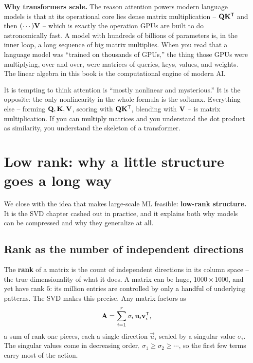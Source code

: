 \begin{applicationbox}
\textbf{Why transformers scale.} The reason attention powers modern language models is
that at its operational core lies dense matrix multiplication -- $\mathbf{Q}\mathbf{K}^{\mathsf{T}}$ and then
$(\cdots)\mathbf{V}$ -- which is exactly the operation GPUs are built to do astronomically
fast. A model with hundreds of billions of parameters is, in the inner loop, a long
sequence of big matrix multiplies. When you read that a language model was ``trained on
thousands of GPUs,'' the thing those GPUs were multiplying, over and over, were matrices
of queries, keys, values, and weights. The linear algebra in this book is the
computational engine of modern AI.
\end{applicationbox}

\begin{trapbox}
It is tempting to think attention is ``mostly nonlinear and mysterious.'' It is the
opposite: the only nonlinearity in the whole formula is the softmax. Everything else --
forming $\mathbf{Q},\mathbf{K},\mathbf{V}$, scoring with $\mathbf{Q}\mathbf{K}^{\mathsf{T}}$, blending with
$\mathbf{V}$ -- is matrix multiplication. If you can multiply matrices and you understand the
dot product as similarity, you understand the skeleton of a transformer.
\end{trapbox}

\section{Low rank: why a little structure goes a long way}
\label{ch34:lowrank}

We close with the idea that makes large-scale ML feasible: \textbf{low-rank
structure.} It is the SVD chapter cashed out in practice, and it explains
both why models can be compressed and why they generalize at all.

\subsection{Rank as the number of independent directions}

The \textbf{rank} of a matrix is the count of independent directions in its
column space -- the true dimensionality of what it does. A matrix can be huge,
$1000\times1000$, and yet have rank $5$: its million entries are controlled by only
a handful of underlying patterns. The SVD makes this precise. Any matrix factors as
\[
\mathbf{A} = \sum_{i=1}^{r} \sigma_i\,\mathbf{u}_i\mathbf{v}_i^{\mathsf{T}},
\]
a sum of rank-one pieces, each a single direction $\vec{u}_i$ scaled by a singular value
$\sigma_i$. The singular values come in decreasing order, $\sigma_1\ge\sigma_2\ge\cdots$,
so the first few terms carry most of the action.

